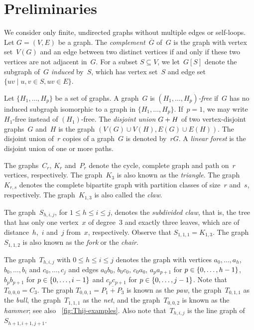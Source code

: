 \documentclass{llncs}
\begin{document}
\section{Preliminaries}\label{s-pre}
We consider only finite, undirected graphs without multiple edges or self-loops.
Let $G=(V,E)$ be a graph.
The {\em complement}~$\overline{G}$ of~$G$ is the graph with vertex set~$V(G)$ and an edge between two distinct vertices if and only if these two vertices are not adjacent in~$G$.
For a subset $S\subseteq V$, we let~$G[S]$ denote the subgraph of~$G$ {\em induced} by~$S$, which has vertex set~$S$ and edge set $\{uv\; |\; u,v\in S, uv\in E\}$.

Let $\{H_1,\ldots,H_p\}$ be a set of graphs.
A graph~$G$ is {\em $(H_1,\ldots,H_p)$-free} if~$G$ has no induced subgraph isomorphic to a graph in $\{H_1,\ldots,H_p\}$.
If~$p=1$, we may write $H_1$-free instead of $(H_1)$-free.
The {\em disjoint union} $G+\nobreak H$ of two vertex-disjoint graphs~$G$ and~$H$ is the graph $(V(G)\cup V(H), E(G)\cup E(H))$.
The disjoint union of~$r$ copies of a graph~$G$ is denoted by~$rG$.
A {\em linear forest} is the disjoint union of one or more paths.

The graphs~$C_r$, $K_r$ and~$P_r$ denote the cycle, complete graph and path on~$r$ vertices, respectively.
The graph~$K_3$ is also known as the {\em triangle}.
The graph~$K_{r,s}$ denotes the complete bipartite graph with partition classes of size~$r$ and~$s$, respectively.
The graph~$K_{1,3}$ is also called the {\em claw}.

The graph~$S_{h,i,j}$, for $1\leq h\leq i\leq j$, denotes the {\em subdivided claw}, that is, the tree that has only one vertex~$x$ of degree~$3$ and exactly three leaves, which are of distance~$h$,~$i$ and~$j$ from~$x$, respectively.
Observe that $S_{1,1,1}=K_{1,3}$. The graph~$S_{1,1,2}$ is also known as the {\em fork} or the {\em chair}.

The graph~$T_{h,i,j}$ with $0\leq h\leq i\leq j$ denotes the graph with vertices $a_0,\ldots,a_h$, $b_0,\ldots,b_i$ and $c_0,\ldots,c_j$ and edges $a_0b_0$, $b_0c_0$, $c_0a_0$, $a_pa_{p+1}$ for $p \in \{0,\ldots, h-\nobreak1\}$, $b_pb_{p+1}$ for $p\in\{0,\ldots,i-\nobreak 1\}$ and $c_pc_{p+1}$ for $p\in\{0,\ldots,j-\nobreak 1\}$.
Note that $T_{0,0,0}=C_3$.
The graph $T_{0,0,1}=\overline{P_1+P_3}$ is known as the {\em paw}, the graph~$T_{0,1,1}$ as the {\em bull}, the graph~$T_{1,1,1}$ as the {\em net}, and the graph~$T_{0,0,2}$ is known as the {\em hammer}; see also \figurename~\ref{fig:Thij-examples}.
Also note that~$T_{h,i,j}$ is the line graph of~$S_{h+1,i+1,j+1}$.
\end{document}
